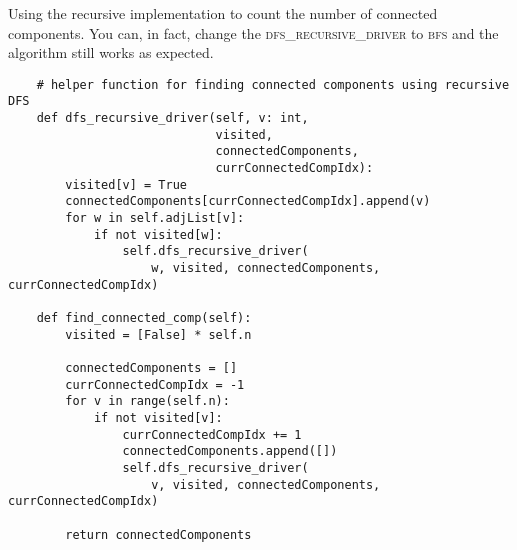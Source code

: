 \noindent Using the recursive implementation to count the number of connected components.
You can, in fact, change the \textsc{dfs\_recursive\_driver} to \textsc{bfs} and the algorithm still works as expected.

\begin{verbatim}
    # helper function for finding connected components using recursive DFS
    def dfs_recursive_driver(self, v: int,
                             visited,
                             connectedComponents,
                             currConnectedCompIdx):
        visited[v] = True
        connectedComponents[currConnectedCompIdx].append(v)
        for w in self.adjList[v]:
            if not visited[w]:
                self.dfs_recursive_driver(
                    w, visited, connectedComponents, currConnectedCompIdx)

    def find_connected_comp(self):
        visited = [False] * self.n

        connectedComponents = []
        currConnectedCompIdx = -1
        for v in range(self.n):
            if not visited[v]:
                currConnectedCompIdx += 1
                connectedComponents.append([])
                self.dfs_recursive_driver(
                    v, visited, connectedComponents, currConnectedCompIdx)

        return connectedComponents
\end{verbatim}

